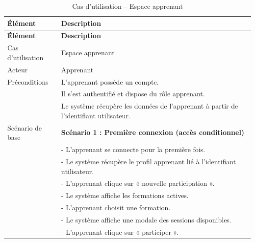 {
\begin{longtable}{|l|p{12cm}|}
\caption{Cas d'utilisation -- Espace apprenant}
\label{tab:espace_apprenant} \\
\hline
\textbf{Élément} & \textbf{Description} \\
\hline
\endfirsthead
\hline
\textbf{Élément} & \textbf{Description} \\
\hline
\endhead

Cas d'utilisation & Espace apprenant \\
\hline

Acteur & Apprenant \\
\hline

Préconditions &
L'apprenant possède un compte. \\
& Il s'est authentifié et dispose du rôle apprenant. \\
& Le système récupère les données de l'apprenant à partir de l'identifiant utilisateur. \\
\hline

Scénario de base &
\textbf{Scénario 1 : Première connexion (accès conditionnel)} \\
&- L'apprenant se connecte pour la première fois. \\
&- Le système récupère le profil apprenant lié à l'identifiant utilisateur. \\
&- L'apprenant clique sur « nouvelle participation ». \\
&- Le système affiche les formations actives. \\

&- L'apprenant choisit une formation. \\


&- Le système affiche une modale des sessions disponibles. \\
&- L'apprenant clique sur « participer ». \\


\end{longtable}}
